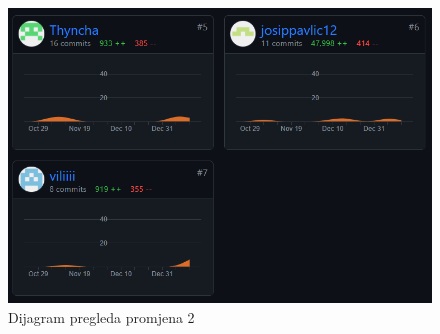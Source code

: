 		\begin{figure}[H]
			\includegraphics[width=\textwidth]{slike/graf2.png} %
			\caption{Dijagram pregleda promjena 2}
			\label{fig:dijagrampregpr2} %
		\end{figure}
		
	